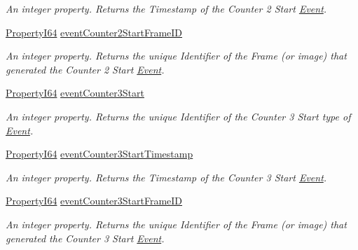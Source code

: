 \begin{DoxyCompactItemize}
\begin{DoxyCompactList}\small\item\em An integer property. Returns the Timestamp of the Counter 2 Start \hyperlink{classmv_i_m_p_a_c_t_1_1acquire_1_1_event}{Event}. \end{DoxyCompactList}\item 
\hyperlink{group___common_interface_ga81749b2696755513663492664a18a893}{Property\+I64} \hyperlink{classmv_i_m_p_a_c_t_1_1acquire_1_1_gen_i_cam_1_1_event_control_ac4441f07bb55011f2da31682a29ada4c}{event\+Counter2\+Start\+Frame\+I\+D}
\begin{DoxyCompactList}\small\item\em An integer property. Returns the unique Identifier of the Frame (or image) that generated the Counter 2 Start \hyperlink{classmv_i_m_p_a_c_t_1_1acquire_1_1_event}{Event}. \end{DoxyCompactList}\item 
\hyperlink{group___common_interface_ga81749b2696755513663492664a18a893}{Property\+I64} \hyperlink{classmv_i_m_p_a_c_t_1_1acquire_1_1_gen_i_cam_1_1_event_control_ae705fe6e513dc55e8cf0ffb3aec05d2d}{event\+Counter3\+Start}
\begin{DoxyCompactList}\small\item\em An integer property. Returns the unique Identifier of the Counter 3 Start type of \hyperlink{classmv_i_m_p_a_c_t_1_1acquire_1_1_event}{Event}. \end{DoxyCompactList}\item 
\hyperlink{group___common_interface_ga81749b2696755513663492664a18a893}{Property\+I64} \hyperlink{classmv_i_m_p_a_c_t_1_1acquire_1_1_gen_i_cam_1_1_event_control_a0184c5f30ec97c81af9af1f4a494a7f0}{event\+Counter3\+Start\+Timestamp}
\begin{DoxyCompactList}\small\item\em An integer property. Returns the Timestamp of the Counter 3 Start \hyperlink{classmv_i_m_p_a_c_t_1_1acquire_1_1_event}{Event}. \end{DoxyCompactList}\item 
\hyperlink{group___common_interface_ga81749b2696755513663492664a18a893}{Property\+I64} \hyperlink{classmv_i_m_p_a_c_t_1_1acquire_1_1_gen_i_cam_1_1_event_control_a7c29f55301013e0d522719ee768ec868}{event\+Counter3\+Start\+Frame\+I\+D}
\begin{DoxyCompactList}\small\item\em An integer property. Returns the unique Identifier of the Frame (or image) that generated the Counter 3 Start \hyperlink{classmv_i_m_p_a_c_t_1_1acquire_1_1_event}{Event}. \end{DoxyCompactList}\item 

\end{DoxyCompactItemize}
